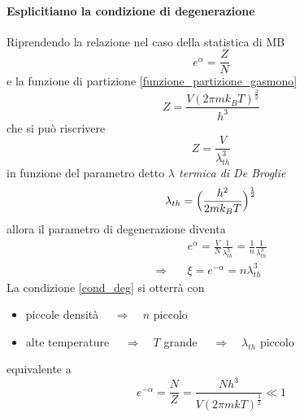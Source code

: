 \paragraph{Esplicitiamo la condizione di degenerazione}
Riprendendo la relazione nel caso della statistica di MB
\begin{equation}
e^{\alpha} = \frac{Z}{N}
\end{equation}
e la funzione di partizione \ref{funzione_partizione_gasmono}
\begin{equation}
Z = \frac{V (2\pi m k_B T)^{ \frac{3}{2} }}{h^3}
\end{equation}
che si può riscrivere 
\begin{equation}
Z = \frac{V}{\lambda_{th}^3}
\end{equation}
in funzione del parametro detto \textit{$\lambda$ termica di De Broglie}
\begin{equation}
\lambda_{th} = \Bigl(  \frac{h^2}{2 m k_B T}  \Bigr)^{ \frac{1}{2} }
\label{lambda_th_debroglie}
\end{equation}
allora il parametro di degenerazione diventa
\begin{equation}
\begin{split}
& e^{\alpha} = \frac{V}{N} \frac{1}{\lambda_{th}^3} = \frac{1}{n} \frac{1}{\lambda_{th}^3} \\
\Rightarrow\quad & \xi = e^{-\alpha} = n \lambda_{th}^3
\end{split}
\end{equation}
La condizione \ref{cond_deg} si otterrà con
\begin{itemize}
\item piccole densità $\quad\Rightarrow\quad n$ piccolo 
\item alte temperature $\quad\Rightarrow\quad T$ grande $\quad\Rightarrow\quad \lambda_{th}$ piccolo
\end{itemize}
equivalente a
\begin{equation}
e^{-\alpha} = \frac{N}{Z} =  \frac{N h^3}{V (2 \pi m k T)^{\frac{3}{2}}} \ll 1
\end{equation}

